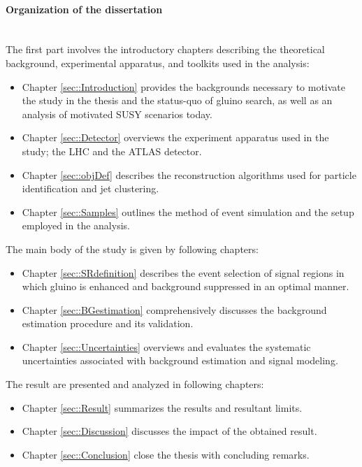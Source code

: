 \paragraph{Organization of the dissertation} \mbox{}  \\
The first part involves the introductory chapters describing the theoretical background, experimental apparatus, and toolkits used in the analysis:
\begin{itemize}
\item Chapter \ref{sec::Introduction} provides the backgrounds necessary to motivate the study in the thesis and the status-quo of gluino search, as well as an analysis of motivated SUSY scenarios today.
\item Chapter \ref{sec::Detector} overviews the experiment apparatus used in the study; the LHC and the ATLAS detector. 
\item Chapter \ref{sec::objDef} describes the reconstruction algorithms used for particle identification and jet clustering. 
\item Chapter \ref{sec::Samples} outlines the method of event simulation and the setup employed in the analysis. 
\end{itemize}
%
\noindent The main body of the study is given by following chapters:
\begin{itemize}
\item Chapter \ref{sec::SRdefinition} describes the event selection of signal regions in which gluino is enhanced and background suppressed in an optimal manner.
\item Chapter \ref{sec::BGestimation} comprehensively discusses the background estimation procedure and its validation.
\item Chapter \ref{sec::Uncertainties} overviews and evaluates the systematic uncertainties associated with background estimation and signal modeling. 
\end{itemize}
%
\noindent The result are presented and analyzed in following chapters:
\begin{itemize}
\item Chapter \ref{sec::Result} summarizes the results and resultant limits. 
\item Chapter \ref{sec::Discussion} discusses the impact of the obtained result.
\item Chapter \ref{sec::Conclusion} close the thesis with concluding remarks.
\end{itemize}


